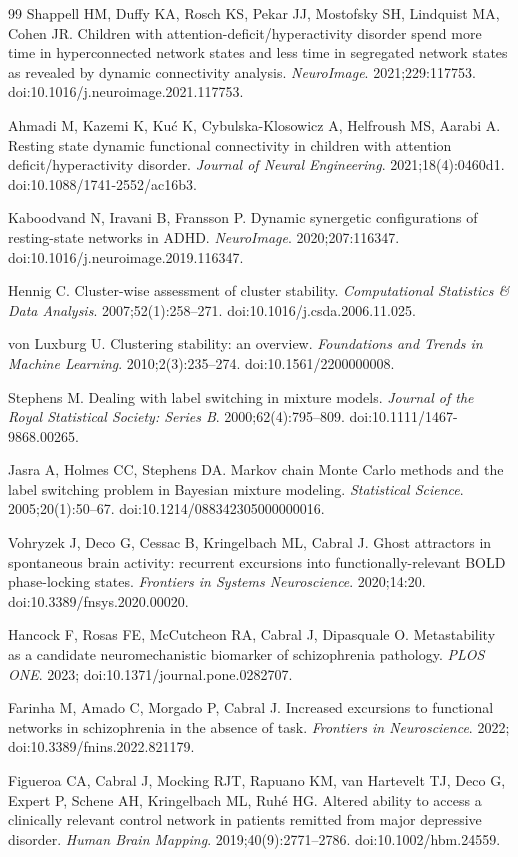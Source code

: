 \documentclass[11pt]{article}
\theoremstyle{definition}
\begin{document}
\begin{thebibliography}{99}
Shappell HM, Duffy KA, Rosch KS, Pekar JJ, Mostofsky SH, Lindquist MA, Cohen JR.
Children with attention-deficit/hyperactivity disorder spend more time in hyperconnected
network states and less time in segregated network states as revealed by dynamic
connectivity analysis.
\textit{NeuroImage}. 2021;229:117753. doi:10.1016/j.neuroimage.2021.117753.

Ahmadi M, Kazemi K, Ku\'c K, Cybulska-Klosowicz A, Helfroush MS, Aarabi A.
Resting state dynamic functional connectivity in children with attention
deficit/hyperactivity disorder.
\textit{Journal of Neural Engineering}. 2021;18(4):0460d1.
doi:10.1088/1741-2552/ac16b3.

Kaboodvand N, Iravani B, Fransson P.
Dynamic synergetic configurations of resting-state networks in ADHD.
\textit{NeuroImage}. 2020;207:116347. doi:10.1016/j.neuroimage.2019.116347.

Hennig C.
Cluster-wise assessment of cluster stability.
\textit{Computational Statistics \& Data Analysis}. 2007;52(1):258--271.
doi:10.1016/j.csda.2006.11.025.

von Luxburg U.
Clustering stability: an overview.
\textit{Foundations and Trends in Machine Learning}. 2010;2(3):235--274.
doi:10.1561/2200000008.

Stephens M.
Dealing with label switching in mixture models.
\textit{Journal of the Royal Statistical Society: Series B}. 2000;62(4):795--809.
doi:10.1111/1467-9868.00265.

Jasra A, Holmes CC, Stephens DA.
Markov chain Monte Carlo methods and the label switching problem in Bayesian mixture
modeling.
\textit{Statistical Science}. 2005;20(1):50--67. doi:10.1214/088342305000000016.

Vohryzek J, Deco G, Cessac B, Kringelbach ML, Cabral J.
Ghost attractors in spontaneous brain activity: recurrent excursions into functionally-relevant
BOLD phase-locking states.
\textit{Frontiers in Systems Neuroscience}. 2020;14:20. doi:10.3389/fnsys.2020.00020.

Hancock F, Rosas FE, McCutcheon RA, Cabral J, Dipasquale O.
Metastability as a candidate neuromechanistic biomarker of schizophrenia pathology.
\textit{PLOS ONE}. 2023; doi:10.1371/journal.pone.0282707.

Farinha M, Amado C, Morgado P, Cabral J.
Increased excursions to functional networks in schizophrenia in the absence of task.
\textit{Frontiers in Neuroscience}. 2022; doi:10.3389/fnins.2022.821179.

Figueroa CA, Cabral J, Mocking RJT, Rapuano KM, van Hartevelt TJ, Deco G, Expert P,
Schene AH, Kringelbach ML, Ruh\'e HG.
Altered ability to access a clinically relevant control network in patients remitted from
major depressive disorder.
\textit{Human Brain Mapping}. 2019;40(9):2771--2786. doi:10.1002/hbm.24559.

\end{thebibliography}
\end{document}
